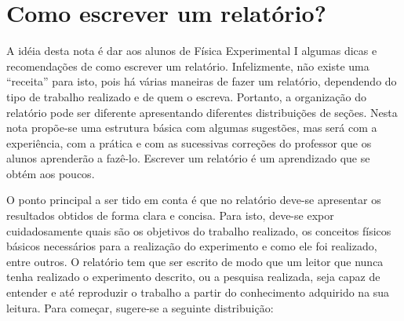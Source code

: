 \chapter{Como escrever um relatório?}
\label{sec:relatorios}
\vspace{-0.7cm}

A idéia desta nota é dar aos alunos de Física Experimental I algumas dicas e re\-co\-men\-da\-ções de como escrever um relatório. Infelizmente, não existe uma “receita” para isto, pois há várias maneiras de fazer um relatório, dependendo do tipo de trabalho realizado e de quem o escreva. Portanto, a organização do relatório pode ser diferente apresentando diferentes distribuições de seções. Nesta nota propõe-se uma estrutura básica com algumas sugestões, mas será com a experiência, com a prática e com as sucessivas correções do professor que os alunos aprenderão a fazê-lo. Escrever um relatório é um aprendizado que se obtém aos poucos.
 
O ponto principal a ser tido em conta é que no relatório deve-se apresentar os resultados obtidos de forma clara e concisa. Para isto, deve-se expor cuidadosamente quais são os objetivos do trabalho realizado, os conceitos físicos básicos necessários para a realização do experimento e como ele foi realizado, entre outros. O relatório tem que ser escrito de modo que um leitor que nunca tenha realizado o experimento descrito, ou a pesquisa realizada, seja capaz de entender e até reproduzir o trabalho a partir do conhecimento adquirido na sua leitura. Para começar, sugere-se a seguinte distribuição:

